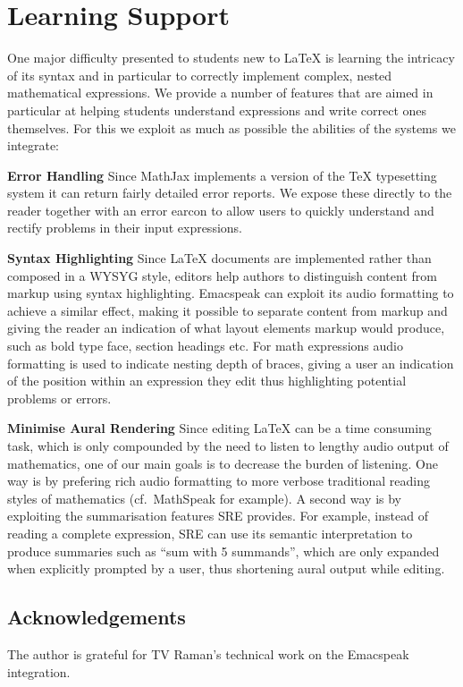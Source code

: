 \documentclass{sig-alternate-05-2015}
\newcommand{\sre}{SRE\xspace}
\begin{document}
\section{Learning Support}
\label{sec:learning-features}

One major difficulty presented to students new to {\LaTeX} is learning the
intricacy of its syntax and in particular to correctly implement complex, nested
mathematical expressions.  We provide a number of features that are aimed in
particular at helping students understand expressions and write correct ones
themselves. For this we exploit as much as possible the abilities of the systems
we integrate:

\textbf{Error Handling} Since MathJax implements a version of the TeX
typesetting system it can return fairly detailed error reports. We expose these
directly to the reader together with an error earcon to allow users to quickly
understand and rectify problems in their input expressions.

\textbf{Syntax Highlighting} Since {\LaTeX} documents are implemented rather
than composed in a WYSYG style, editors help authors to distinguish content from
markup using syntax highlighting. Emacspeak can exploit its audio formatting to
achieve a similar effect, making it possible to separate content from markup and
giving the reader an indication of what layout elements markup would produce,
such as bold type face, section headings etc. For math expressions audio
formatting is used to indicate nesting depth of braces, giving a user an
indication of the position within an expression they edit thus highlighting
potential problems or errors.


\textbf{Minimise Aural Rendering} Since editing {\LaTeX} can be a time consuming
task, which is only compounded by the need to listen to lengthy audio output of
mathematics, one of our main goals is to decrease the burden of listening. One
way is by prefering rich audio formatting to more verbose traditional reading
styles of mathematics (cf.~MathSpeak for example). A second way is by exploiting
the summarisation features \sre provides. For example, instead of reading a
complete expression, \sre can use its semantic interpretation to produce
summaries such as ``sum with 5 summands'', which are only expanded when
explicitly prompted by a user, thus shortening aural output while editing.



\subsection*{Acknowledgements}

The author is grateful for TV Raman's technical work on the Emacspeak
integration.



\end{document}
